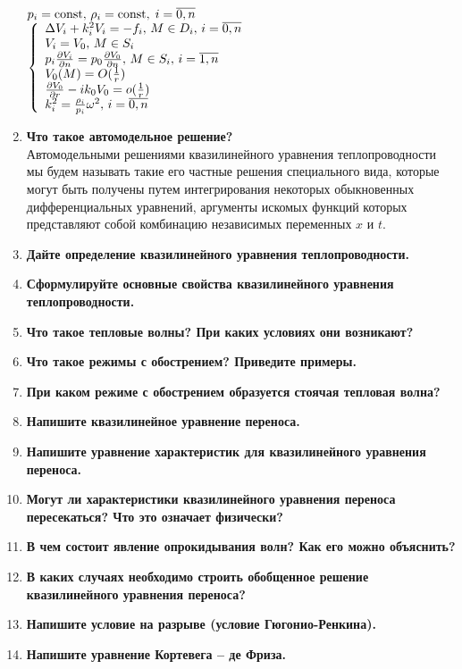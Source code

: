 \begin{enumerate}[label=\textbf{\underline{\arabic*.}}]
      $p_i=\operatorname{const},\,\rho_i=\operatorname{const},\;i=\overline{0,n}$\\
      $\left\{\begin{array}{l}
            \Delta V_i+k_i^2 V_i=-f_i,\,M\in D_i,\,i=\overline{0,n}\\
            V_i = V_0,\,M\in S_i\\
            p_i \frac{\partial V_i}{\partial n}=p_0\frac{\partial V_0}{\partial n},\,M\in S_i,\,i=\overline{1,n}\\
            V_0(M) = O(\frac{1}{r})\\
            \frac{\partial V_0}{\partial r}-ik_0 V_0 = o(\frac{1}{r})\\
            k_i^2=\frac{\rho_i}{p_i}\omega^2,\,i=\overline{0,n}
      \end{array}\right.$
\item \textbf{Что такое автомодельное решение?}\\
      Автомодельными решениями квазилинейного уравнения теплопроводности мы будем называть такие его частные решения специального вида, которые могут быть получены путем интегрирования некоторых обыкновенных дифференциальных уравнений, аргументы искомых функций которых представляют собой комбинацию независимых переменных $x$ и $t$.
\item \textbf{Дайте определение квазилинейного уравнения теплопроводности.}
\item \textbf{Сформулируйте основные свойства квазилинейного уравнения теплопроводности.}
\item \textbf{Что такое тепловые волны? При каких условиях они возникают?}
\item \textbf{Что такое режимы с обострением? Приведите примеры.}
\item \textbf{При каком режиме с обострением образуется стоячая тепловая волна?}
\item \textbf{Напишите квазилинейное уравнение переноса.}
\item \textbf{Напишите уравнение характеристик для квазилинейного уравнения переноса.}
\item \textbf{Могут ли характеристики квазилинейного уравнения переноса пересекаться? Что это означает физически?}
\item \textbf{В чем состоит явление опрокидывания волн? Как его можно объяснить?}
\item \textbf{В каких случаях необходимо строить обобщенное решение квазилинейного уравнения переноса?}
\item \textbf{Напишите условие на разрыве (условие Гюгонио-Ренкина).}
\item \textbf{Напишите уравнение Кортевега – де Фриза.}\\

\end{enumerate}
